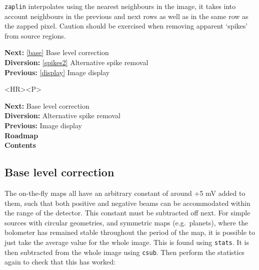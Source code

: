 \documentclass[11pt]{article}
\newenvironment{latexonly}{}{}
\newcommand{\htmlref}[2]{#1}
\newcommand{\xref}[3]{#1}
\newcommand{\xlabel}[1]{}
\begin{document}
   {\tt zaplin} interpolates using the nearest neighbours in the image,
   it takes into account neighbours in the previous and next rows as well
   as in the same row as the zapped pixel.
   Caution should be exercised when removing apparent
   `spikes' from source regions.

\begin{latexonly}
{\bf Next:} \ref{base} Base level correction\\
{\bf Diversion:} \ref{spikes2} Alternative spike removal\\
{\bf Previous:} \ref{display} Image display\\
\end{latexonly}

\begin{htmlonly}
\begin{rawhtml} <HR><P> \end{rawhtml}
{\bf \htmlref{Next:}{base}} Base level correction\\
{\bf \htmlref{Diversion:}{spikes2}} Alternative spike removal\\
{\bf \htmlref{Previous:}{display}} Image display\\
{\bf \htmlref{Roadmap}{roadmap}}\\
{\bf \htmlref{Contents}{stardoccontents}}\\
\end{htmlonly}


\subsection{\label{base}\xlabel{base}Base level correction}

   The
\htmlref{on-the-fly maps}{glossonthefly}
   all have an arbitrary constant of around +5 mV
   added to them, such that both positive and negative beams can be
   accommodated within the range of the detector. This constant must be
   subtracted off next. For simple sources with circular geometries, and
   symmetric maps (e.g.\ planets), where the bolometer has remained
   stable throughout the period of the map, it is possible to just take
   the average value for the whole image. This is found using
{\tt \xref{stats}{sun95}{STATS}}.
   It is then subtracted from the whole image using
{\tt \xref{csub}{sun95}{CSUB}}.
   Then perform the statistics again to check that this
   has worked:
\end{document}
